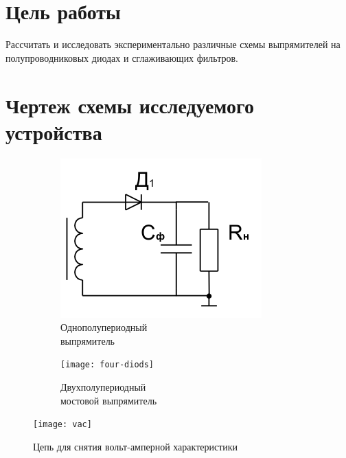 





\section{Цель работы}

Рассчитать и исследовать экспериментально различные схемы выпрямителей на полупроводниковых диодах и сглаживающих фильтров.

\section{Чертеж схемы исследуемого устройства}

\begin{figure}[h]
\begin{center}
	\begin{subfigure}[b]{0.35\textwidth}
		\includegraphics[scale=0.75]{diod}
		\caption{Однополупериодный \\выпрямитель}
	\end{subfigure}
	\begin{subfigure}[b]{0.35\textwidth}
		\texttt{[image: four-diods]}
		\caption{Двухполупериодный \\мостовой выпрямитель}
	\end{subfigure}
	\caption{}
\end{center}
\end{figure}

\vspace{-1cm}

\begin{figure}[H]
\begin{center}
	\texttt{[image: vac]}
	\caption{Цепь для снятия вольт-амперной характеристики}
\end{center}
\end{figure}

